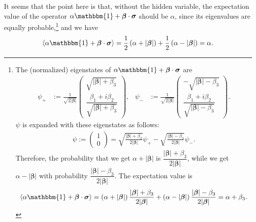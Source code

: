 \documentclass[12pt]{article}
\begin{document}
It seems that the point here is that, without the hidden variable, the expectation value of the operator $\alpha \mathbbm{1} + \bm{\beta} \cdot \bm{\sigma}$ should be $\alpha$, since its eigenvalues are equally probable,\footnote{The (normalized) eigenstates of $\alpha \mathbbm{1} +\boldsymbol{\beta}\cdot\boldsymbol{\sigma}$ are
\begin{align*}
  \psi_{+}
  &:= \frac{1}{\sqrt{2|\bm{\beta}|}}
  \begin{pmatrix}
    \sqrt{|\bm{\beta}|+\beta_3}\\
    \dfrac{\beta_1+i\beta_2}{\sqrt{|\bm{\beta}|+\beta_3}}
  \end{pmatrix},
  &
  \psi_{-}
  &:= \frac{1}{\sqrt{2|\bm{\beta}|}}
  \begin{pmatrix}
    -\sqrt{|\bm{\beta}|-\beta_3}\\
    \dfrac{\beta_1+i\beta_2}{\sqrt{|\bm{\beta}|-\beta_3}}
  \end{pmatrix}.
\end{align*}
$\psi$ is expanded with these eigenstates as follows: 
\begin{align*}
  \psi
  :=
  \begin{pmatrix}
    1\\
    0
  \end{pmatrix}
  = \sqrt{\frac{|\bm{\beta}|+\beta_3}{2|\bm{\beta}|}}\psi_{+} - \sqrt{\frac{|\bm{\beta}|-\beta_3}{2|\bm{\beta}|}}\psi_{-}.
\end{align*}
Therefore, the probability that we get $\alpha+|\bm{\beta}|$ is $\dfrac{|\bm{\beta}|+\beta_3}{2|\bm{\beta}|}$, while we get $\alpha-|\bm{\beta}|$ with probability $\dfrac{|\bm{\beta}|-\beta_3}{2|\bm{\beta}|}$.
The expectation value is
\begin{align*}
  \langle \alpha \mathbbm{1} + \bm{\beta} \cdot \bm{\sigma} \rangle
  = \left( \alpha+|\bm{\beta}| \right) \dfrac{|\bm{\beta}|+\beta_3}{2|\bm{\beta}|} + \left( \alpha-|\bm{\beta}| \right) \dfrac{|\bm{\beta}|-\beta_3}{2|\bm{\beta}|}
  = \alpha + \beta_3.
\end{align*}
} and we have 
\begin{displaymath}
  \langle \alpha \mathbbm{1} + \bm{\beta} \cdot \bm{\sigma} \rangle
  = \frac{1}{2} \left( \alpha + |\bm{\beta}| \right) + \frac{1}{2} \left( \alpha - |\bm{\beta}| \right)
  = \alpha.
\end{displaymath}
\end{document}
